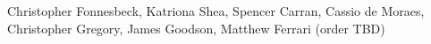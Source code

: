 Christopher Fonnesbeck, Katriona Shea, Spencer Carran, Cassio de Moraes, Christopher Gregory, James Goodson, Matthew Ferrari (order TBD)